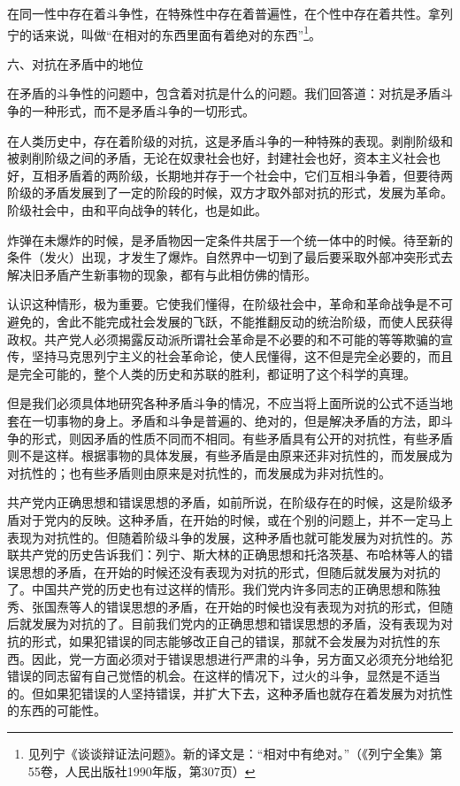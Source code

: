 \documentclass[UTF8, 12pt, a4paper]{ctexrep}
\begin{document}
在同一性中存在着斗争性，在特殊性中存在着普遍性，在个性中存在着共性。拿列宁的话来说，叫做“在相对的东西里面有着绝对的东西”\footnote{见列宁《谈谈辩证法问题》。新的译文是：“相对中有绝对。”（《列宁全集》第55卷，人民出版社1990年版，第307页）}。

六、对抗在矛盾中的地位


在矛盾的斗争性的问题中，包含着对抗是什么的问题。我们回答道：对抗是矛盾斗争的一种形式，而不是矛盾斗争的一切形式。

在人类历史中，存在着阶级的对抗，这是矛盾斗争的一种特殊的表现。剥削阶级和被剥削阶级之间的矛盾，无论在奴隶社会也好，封建社会也好，资本主义社会也好，互相矛盾着的两阶级，长期地并存于一个社会中，它们互相斗争着，但要待两阶级的矛盾发展到了一定的阶段的时候，双方才取外部对抗的形式，发展为革命。阶级社会中，由和平向战争的转化，也是如此。

炸弹在未爆炸的时候，是矛盾物因一定条件共居于一个统一体中的时候。待至新的条件（发火）出现，才发生了爆炸。自然界中一切到了最后要采取外部冲突形式去解决旧矛盾产生新事物的现象，都有与此相仿佛的情形。

认识这种情形，极为重要。它使我们懂得，在阶级社会中，革命和革命战争是不可避免的，舍此不能完成社会发展的飞跃，不能推翻反动的统治阶级，而使人民获得政权。共产党人必须揭露反动派所谓社会革命是不必要的和不可能的等等欺骗的宣传，坚持马克思列宁主义的社会革命论，使人民懂得，这不但是完全必要的，而且是完全可能的，整个人类的历史和苏联的胜利，都证明了这个科学的真理。

但是我们必须具体地研究各种矛盾斗争的情况，不应当将上面所说的公式不适当地套在一切事物的身上。矛盾和斗争是普遍的、绝对的，但是解决矛盾的方法，即斗争的形式，则因矛盾的性质不同而不相同。有些矛盾具有公开的对抗性，有些矛盾则不是这样。根据事物的具体发展，有些矛盾是由原来还非对抗性的，而发展成为对抗性的；也有些矛盾则由原来是对抗性的，而发展成为非对抗性的。

共产党内正确思想和错误思想的矛盾，如前所说，在阶级存在的时候，这是阶级矛盾对于党内的反映。这种矛盾，在开始的时候，或在个别的问题上，并不一定马上表现为对抗性的。但随着阶级斗争的发展，这种矛盾也就可能发展为对抗性的。苏联共产党的历史告诉我们：列宁、斯大林的正确思想和托洛茨基、布哈林等人的错误思想的矛盾，在开始的时候还没有表现为对抗的形式，但随后就发展为对抗的了。中国共产党的历史也有过这样的情形。我们党内许多同志的正确思想和陈独秀、张国焘等人的错误思想的矛盾，在开始的时候也没有表现为对抗的形式，但随后就发展为对抗的了。目前我们党内的正确思想和错误思想的矛盾，没有表现为对抗的形式，如果犯错误的同志能够改正自己的错误，那就不会发展为对抗性的东西。因此，党一方面必须对于错误思想进行严肃的斗争，另方面又必须充分地给犯错误的同志留有自己觉悟的机会。在这样的情况下，过火的斗争，显然是不适当的。但如果犯错误的人坚持错误，并扩大下去，这种矛盾也就存在着发展为对抗性的东西的可能性。
\end{document}
